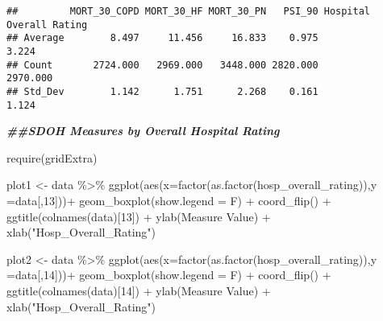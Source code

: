 \documentclass[
]{article}
\newenvironment{Shaded}{\begin{snugshade}}{\end{snugshade}}
\newcommand{\AttributeTok}[1]{\textcolor[rgb]{0.77,0.63,0.00}{#1}}
\newcommand{\DecValTok}[1]{\textcolor[rgb]{0.00,0.00,0.81}{#1}}
\newcommand{\DocumentationTok}[1]{\textcolor[rgb]{0.56,0.35,0.01}{\textbf{\textit{#1}}}}
\newcommand{\FunctionTok}[1]{\textcolor[rgb]{0.00,0.00,0.00}{#1}}
\newcommand{\NormalTok}[1]{#1}
\newcommand{\OtherTok}[1]{\textcolor[rgb]{0.56,0.35,0.01}{#1}}
\newcommand{\SpecialCharTok}[1]{\textcolor[rgb]{0.00,0.00,0.00}{#1}}
\newcommand{\StringTok}[1]{\textcolor[rgb]{0.31,0.60,0.02}{#1}}
\begin{document}
\begin{verbatim}
##         MORT_30_COPD MORT_30_HF MORT_30_PN   PSI_90 Hospital Overall Rating
## Average        8.497     11.456     16.833    0.975                   3.224
## Count       2724.000   2969.000   3448.000 2820.000                2970.000
## Std_Dev        1.142      1.751      2.268    0.161                   1.124
\end{verbatim}

\begin{Shaded}
\begin{Highlighting}[]
\DocumentationTok{\#\#SDOH Measures by Overall Hospital Rating}

\FunctionTok{require}\NormalTok{(gridExtra)}

\NormalTok{plot1 }\OtherTok{\textless{}{-}}\NormalTok{ data }\SpecialCharTok{\%\textgreater{}\%} \FunctionTok{ggplot}\NormalTok{(}\FunctionTok{aes}\NormalTok{(}\AttributeTok{x=}\FunctionTok{factor}\NormalTok{(}\FunctionTok{as.factor}\NormalTok{(hosp\_overall\_rating)),}\AttributeTok{y =}\NormalTok{data[,}\DecValTok{13}\NormalTok{]))}\SpecialCharTok{+}
  \FunctionTok{geom\_boxplot}\NormalTok{(}\AttributeTok{show.legend =}\NormalTok{ F) }\SpecialCharTok{+}
  \FunctionTok{coord\_flip}\NormalTok{() }\SpecialCharTok{+}
  \FunctionTok{ggtitle}\NormalTok{(}\FunctionTok{colnames}\NormalTok{(data)[}\DecValTok{13}\NormalTok{]) }\SpecialCharTok{+} 
  \FunctionTok{ylab}\NormalTok{(}\StringTok{\textquotesingle{}Measure Value\textquotesingle{}}\NormalTok{) }\SpecialCharTok{+} \FunctionTok{xlab}\NormalTok{(}\StringTok{"Hosp\_Overall\_Rating"}\NormalTok{)}


\NormalTok{plot2 }\OtherTok{\textless{}{-}}\NormalTok{ data }\SpecialCharTok{\%\textgreater{}\%} \FunctionTok{ggplot}\NormalTok{(}\FunctionTok{aes}\NormalTok{(}\AttributeTok{x=}\FunctionTok{factor}\NormalTok{(}\FunctionTok{as.factor}\NormalTok{(hosp\_overall\_rating)),}\AttributeTok{y =}\NormalTok{data[,}\DecValTok{14}\NormalTok{]))}\SpecialCharTok{+}
  \FunctionTok{geom\_boxplot}\NormalTok{(}\AttributeTok{show.legend =}\NormalTok{ F) }\SpecialCharTok{+}
  \FunctionTok{coord\_flip}\NormalTok{() }\SpecialCharTok{+}
  \FunctionTok{ggtitle}\NormalTok{(}\FunctionTok{colnames}\NormalTok{(data)[}\DecValTok{14}\NormalTok{]) }\SpecialCharTok{+} 
  \FunctionTok{ylab}\NormalTok{(}\StringTok{\textquotesingle{}Measure Value\textquotesingle{}}\NormalTok{) }\SpecialCharTok{+} \FunctionTok{xlab}\NormalTok{(}\StringTok{"Hosp\_Overall\_Rating"}\NormalTok{)}


\end{Highlighting}
\end{Shaded}
\end{document}
